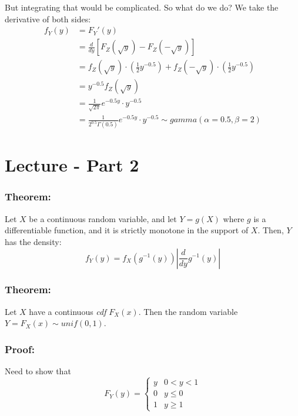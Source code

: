 \documentclass{article}
\begin{document}
\begin{enumerate}
    But integrating that would be complicated. So what do we do? We take the derivative of both sides:
    \begin{equation*}
        \begin{split}
            f_Y(y) &= F_Y'(y)\\
            &= \frac{d}{dy}[F_Z(\sqrt{y}) - F_Z(-\sqrt{y})]\\
            &= f_Z(\sqrt{y})\cdot\left(\frac{1}{2} y^{-0.5}\right) + f_Z(-\sqrt{y})\cdot\left(\frac{1}{2} y^{-0.5}\right)\\
            &= y^{-0.5} f_Z(\sqrt{y})\\
            &= \frac{1}{\sqrt{2\pi}} e^{-0.5 y} \cdot y^{-0.5}\\
            &= \frac{1}{2^{0.5}\Gamma(0.5)} e^{-0.5 y} \cdot y^{-0.5} \sim gamma(\alpha = 0.5, \beta = 2)
        \end{split}
    \end{equation*}
\end{enumerate}

\section{Lecture - Part 2}

\subsubsection*{Theorem:}

Let $X$ be a continuous random variable, and let $Y = g(X)$ where $g$ is a differentiable function, and it is strictly monotone in the support of $X$. Then, $Y$ has the density:
\begin{equation*}
    f_Y(y) = f_X(g^{-1}(y)) \left|\frac{d}{dy} g^{-1}(y) \right|
\end{equation*}

\subsubsection*{Theorem:}

Let $X$ have a continuous \textit{cdf} $F_X(x)$. Then the random variable $Y=F_X(x) \sim unif(0,1)$.
\subsubsection*{Proof:}
    Need to show that
    \begin{equation*}
        F_Y(y) = \begin{cases}
            y & 0 < y < 1\\
            0 & y \leq 0\\
            1 & y \geq 1
        \end{cases}
    \end{equation*}
    
\end{document}
